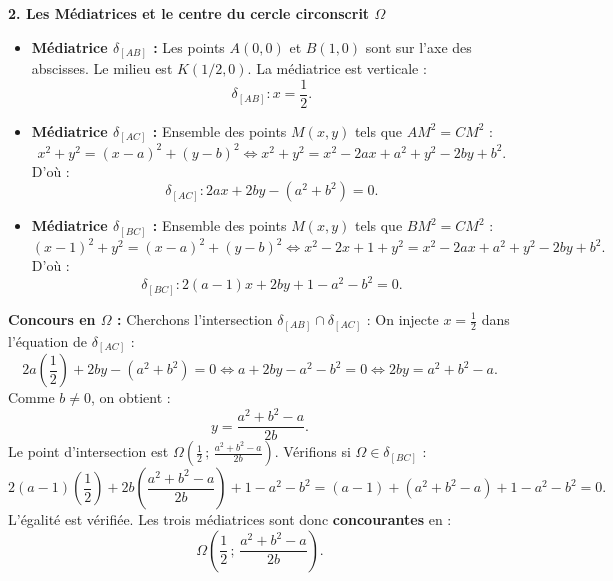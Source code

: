 \documentclass[11pt,a4paper]{article}
\begin{document}
\begin{correctionbox}
\textbf{2. Les Médiatrices et le centre du cercle circonscrit $\Omega$}
\begin{itemize}[leftmargin=1cm]
    \item \textbf{Médiatrice $\delta_{[AB]}$ :} Les points $A(0,0)$ et $B(1,0)$ sont sur l'axe des abscisses. Le milieu est $K(1/2, 0)$. La médiatrice est verticale :
    \[
    \delta_{[AB]} : x = \frac{1}{2}.
    \]
    \item \textbf{Médiatrice $\delta_{[AC]}$ :} Ensemble des points $M(x, y)$ tels que $AM^2 = CM^2$ :
    \[
    x^2 + y^2 = (x - a)^2 + (y - b)^2 \iff x^2 + y^2 = x^2 - 2ax + a^2 + y^2 - 2by + b^2.
    \]
    D'où :
    \[
    \delta_{[AC]} : 2ax + 2by - (a^2 + b^2) = 0.
    \]
    \item \textbf{Médiatrice $\delta_{[BC]}$ :} Ensemble des points $M(x, y)$ tels que $BM^2 = CM^2$ :
    \[
    (x - 1)^2 + y^2 = (x - a)^2 + (y - b)^2 \iff x^2 - 2x + 1 + y^2 = x^2 - 2ax + a^2 + y^2 - 2by + b^2.
    \]
    D'où :
    \[
    \delta_{[BC]} : 2(a - 1)x + 2by + 1 - a^2 - b^2 = 0.
    \]
\end{itemize}
\textbf{Concours en $\Omega$ :} Cherchons l'intersection $\delta_{[AB]} \cap \delta_{[AC]}$ :
On injecte $x = \frac{1}{2}$ dans l'équation de $\delta_{[AC]}$ :
\[
2a\left(\frac{1}{2}\right) + 2by - (a^2 + b^2) = 0 \iff a + 2by - a^2 - b^2 = 0 \iff 2by = a^2 + b^2 - a.
\]
Comme $b \neq 0$, on obtient :
\[
y = \frac{a^2 + b^2 - a}{2b}.
\]
Le point d'intersection est $\Omega\left(\frac{1}{2} \,;\, \frac{a^2 + b^2 - a}{2b}\right)$.
Vérifions si $\Omega \in \delta_{[BC]}$ :
\[
2(a - 1)\left(\frac{1}{2}\right) + 2b\left(\frac{a^2 + b^2 - a}{2b}\right) + 1 - a^2 - b^2 = (a - 1) + (a^2 + b^2 - a) + 1 - a^2 - b^2 = 0.
\]
L'égalité est vérifiée. Les trois médiatrices sont donc \textbf{concourantes} en :
\[
\Omega\left(\frac{1}{2} \,;\, \frac{a^2 + b^2 - a}{2b}\right).
\]


\end{correctionbox}
\end{document}
